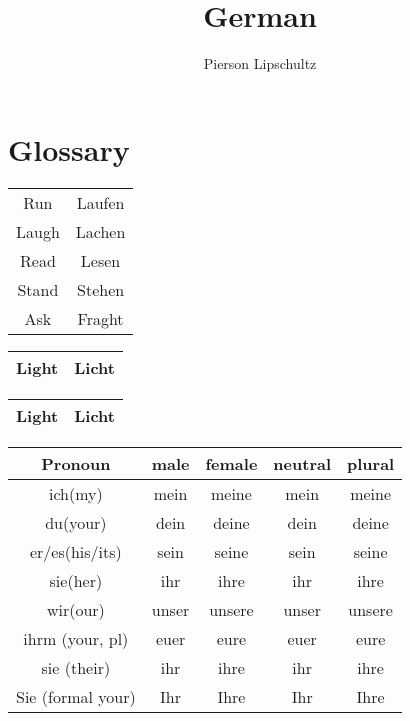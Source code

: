 \documentclass{article}
\title{German}
\author{Pierson Lipschultz}
\begin{document}
\maketitle

\section{Glossary}
\begin{center}
    \begin{tabular}{|c|c|}
        \hline
        Run & Laufen \\
        Laugh & Lachen \\
        Read & Lesen \\
        Stand & Stehen \\
        Ask & Fraght  \\
        \hline
    \end{tabular}
\end{center}

\begin{center}
    \begin{tabular}{|c|c|}
        \hline
        Light & Licht \\
        \hline
    \end{tabular}
\end{center}

\begin{center}
    \begin{tabular}{|c|c|}
        \hline
        Light & Licht \\
        \hline
    \end{tabular}
\end{center}

\begin{center}
\begin{tabular}{|c|c|c|c|c|}
\hline
    Pronoun &male&female&neutral&plural \\
    \hline
    \hline
    ich(my)& mein & meine & mein & meine\\
    \hline
    du(your)&dein&deine&dein&deine \\
    \hline
    er/es(his/its)&sein&seine&sein&seine \\
    \hline
    sie(her)&ihr&ihre&ihr&ihre \\
    \hline
    wir(our)&unser&unsere&unser&unsere \\
    \hline
    ihrm (your, pl)&euer&eure&euer&eure \\
    \hline
    sie (their)&ihr&ihre&ihr&ihre \\
    \hline
    Sie (formal your)&Ihr&Ihre&Ihr&Ihre \\
\hline
\end{tabular}
\end{center}
\end{document}
